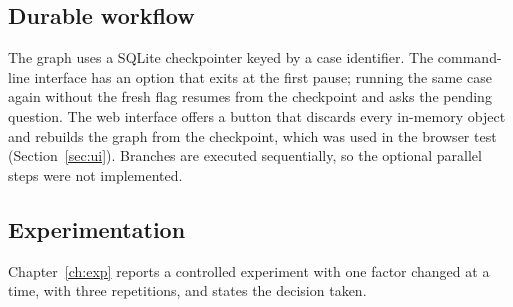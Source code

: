 \subsection{Durable workflow}\label{sec:durable}
The graph uses a SQLite checkpointer keyed by a case identifier. The command-line interface has an option that exits at the first pause; running the same case again without the fresh flag resumes from the checkpoint and asks the pending question. The web interface offers a button that discards every in-memory object and rebuilds the graph from the checkpoint, which was used in the browser test (Section~\ref{sec:ui}). Branches are executed sequentially, so the optional parallel steps were not implemented.

\subsection{Experimentation}
Chapter~\ref{ch:exp} reports a controlled experiment with one factor changed at a time, with three repetitions, and states the decision taken.
